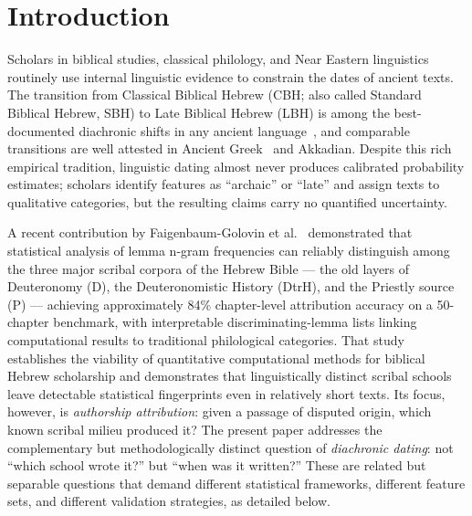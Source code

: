 \documentclass[10pt,letterpaper]{article}
\newcommand{\cbh}{CBH}
\newcommand{\lbh}{LBH}
\begin{document}
\clearpage
{}
\linenumbers

\section*{Introduction}

Scholars in biblical studies, classical philology, and Near Eastern
linguistics routinely use internal linguistic evidence to constrain the
dates of ancient texts.  The transition from Classical Biblical Hebrew
(\cbh{}; also called Standard Biblical Hebrew, SBH) to Late Biblical
Hebrew (\lbh{}) is among the best-documented diachronic shifts in any
ancient language~\cite{Hurvitz1982,Rooker1990,
Polzin1976}, and comparable transitions are well attested in Ancient
Greek~\cite{Horrocks2010} and Akkadian.  Despite this rich empirical
tradition, linguistic dating almost never produces calibrated probability
estimates; scholars identify features as ``archaic'' or ``late'' and
assign texts to qualitative categories, but the resulting claims carry no
quantified uncertainty.

A recent contribution by Faigenbaum-Golovin et al.~\cite{Faigenbaum2025}
demonstrated that statistical analysis of lemma n-gram frequencies can
reliably distinguish among the three major scribal corpora of the Hebrew
Bible --- the old layers of Deuteronomy (D), the Deuteronomistic History
(DtrH), and the Priestly source (P) --- achieving approximately 84\%
chapter-level attribution accuracy on a 50-chapter benchmark, with
interpretable discriminating-lemma lists linking computational results to
traditional philological categories.  That study establishes the viability
of quantitative computational methods for biblical Hebrew scholarship and
demonstrates that linguistically distinct scribal schools leave detectable
statistical fingerprints even in relatively short texts.  Its focus,
however, is \emph{authorship attribution}: given a passage of disputed
origin, which known scribal milieu produced it?  The present paper
addresses the complementary but methodologically distinct question of
\emph{diachronic dating}: not ``which school wrote it?'' but ``when was it
written?''  These are related but separable questions that demand different
statistical frameworks, different feature sets, and different validation
strategies, as detailed below.
\end{document}

